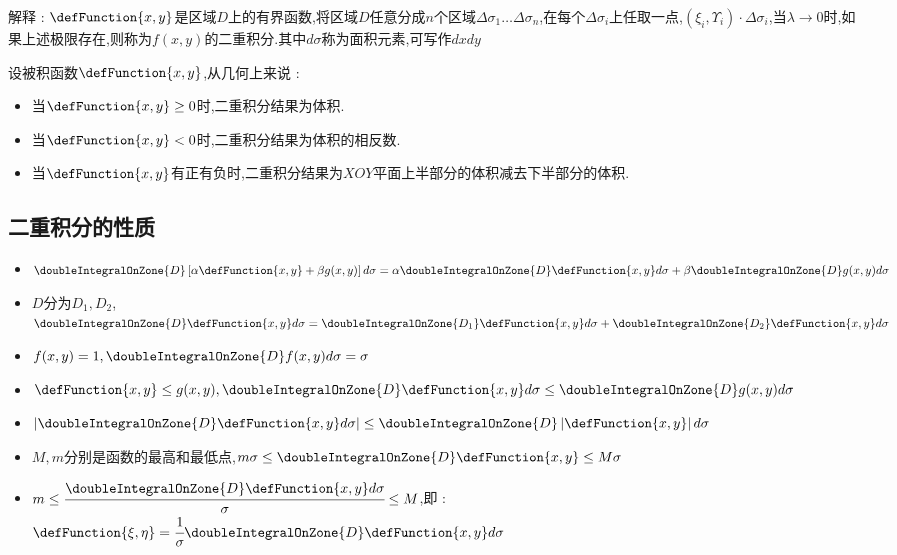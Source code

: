 {{{    解释 : $\defFunction{x,y}$是区域$D$上的有界函数,将区域$D$任意分成$n$个区域$\Delta\sigma_1\dots\Delta\sigma_n$,在每个$\Delta\sigma_i$上任取一点,$(\xi_i,\varUpsilon_i)\cdot\Delta\sigma_i$,当$\lambda \to 0$时,如果上述极限存在,则称为$f(x,y)$的二重积分.其中$d\sigma$称为面积元素,可写作$dxdy$

    设被积函数$\defFunction{x,y}$,从几何上来说 :
    \begin{itemize}
      \item 当$\defFunction{x,y} \geq 0$时,二重积分结果为体积.
      \item 当$\defFunction{x,y} < 0$时,二重积分结果为体积的相反数.
      \item 当$\defFunction{x,y}$有正有负时,二重积分结果为$XOY$平面上半部分的体积减去下半部分的体积.
    \end{itemize}
  }%

  \subsection{二重积分的性质}{
    \begin{itemize}
      \item $\doubleIntegralOnZone{D}\left[\alpha\defFunction{x,y} + \beta g(x,y)\right]d\sigma = \alpha\doubleIntegralOnZone{D}\defFunction{x,y}d\sigma + \beta\doubleIntegralOnZone{D}g(x,y)d\sigma$
      \item $D$分为$D_1,D_2$,$\doubleIntegralOnZone{D}\defFunction{x,y}d\sigma = \doubleIntegralOnZone{D_1}\defFunction{x,y}d\sigma + \doubleIntegralOnZone{D_2}\defFunction{x,y}d\sigma$
      \item $f(x,y) = 1,\doubleIntegralOnZone{D}f(x,y)d\sigma = \sigma$
      \item $\defFunction{x,y} \leq g(x,y), \doubleIntegralOnZone{D}\defFunction{x,y}d\sigma \leq \doubleIntegralOnZone{D}g(x,y)d\sigma$
      \item $\left|\doubleIntegralOnZone{D}\defFunction{x,y}d\sigma\right| \leq \doubleIntegralOnZone{D}\left|\defFunction{x,y}\right|d\sigma$
      \item $M,m$分别是函数的最高和最低点,$m\sigma \leq \doubleIntegralOnZone{D}\defFunction{x,y} \leq M\sigma$
      \item $m \leq \cfrac{\doubleIntegralOnZone{D}\defFunction{x,y}d\sigma}{\sigma} \leq M$,即 : $\defFunction{\xi,\eta} = \cfrac{1}{\sigma}\doubleIntegralOnZone{D}\defFunction{x,y}d\sigma$
    \end{itemize}
  }%

}}
